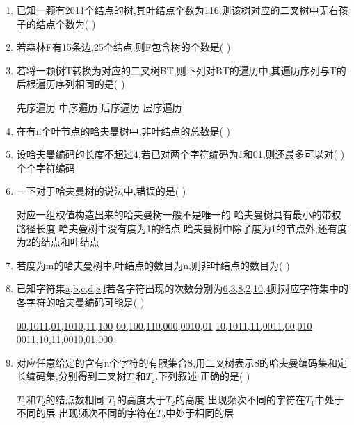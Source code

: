 \documentclass[12pt, a4paper, oneside, UTF8]{ctexbook}
\begin{document}
\begin{enumerate}
    \item \bl 已知一颗有2011个结点的树,其叶结点个数为116,则该树对应的二叉树中无右孩子的结点个数为(   )
    \begin{choices}
    \end{choices}


    \item \bl 若森林F有15条边,25个结点,则F包含树的个数是(    ) 


    \item \bl 若将一颗树T转换为对应的二叉树BT,则下列对BT的遍历中,其遍历序列与T的后根遍历序列相同的是(   ) 
    \begin{choices}
        \task 先序遍历
        \task 中序遍历
        \task 后序遍历
        \task 层序遍历
    \end{choices}


    \item 在有n个叶节点的哈夫曼树中,非叶结点的总数是(   ) 
    

    \item 设哈夫曼编码的长度不超过4,若已对两个字符编码为1和01,则还最多可以对(   )个个字符编码 
    

    \item 一下对于哈夫曼树的说法中,错误的是(    ) 
    \begin{choices}[1]
        \task 对应一组权值构造出来的哈夫曼树一般不是唯一的
        \task 哈夫曼树具有最小的带权路径长度
        \task 哈夫曼树中没有度为1的结点
        \task 哈夫曼树中除了度为1的节点外,还有度为2的结点和叶结点 
    \end{choices}


    \item 若度为m的哈夫曼树中,叶结点的数目为n,则非叶结点的数目为(     ) 
    

    \item \bl 已知字符集\underline{a,b,c,d,e,f}若各字符出现的次数分别为\underline{6,3,8,2,10,4}则对应字符集中的
    各字符的哈夫曼编码可能是(    ) 
    \begin{choices}[2]
        \task \underline{00,1011,01,1010,11,100} 
        \task \underline{00,100,110,000,0010,01}
        \task \underline{10,1011,11,0011,00,010}
        \task \underline{0011,10,11,0010,01,000}
    \end{choices}


    \item \bl 对应任意给定的含有n个字符的有限集合S,用二叉树表示S的哈夫曼编码集和定长编码集,分别得到二叉树$T_1$和$T_2$.下列叙述
    正确的是(    ) 
    \begin{choices}[1]
        \task $T_1$和$T_2$的结点数相同
        \task $T_1$的高度大于$T_2$的高度
        \task 出现频次不同的字符在$T_1$中处于不同的层
        \task 出现频次不同的字符在$T_2$中处于相同的层
    \end{choices}




\end{enumerate}
\end{document}
